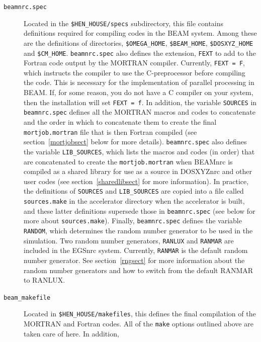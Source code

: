 \documentclass[12pt,twoside]{article}
\begin{document}
\begin{description}
\item [{\tt beamnrc.spec}] Located in the {\tt \$HEN\_HOUSE/specs}
subdirectory, this file contains definitions required for
compiling codes in the BEAM system.  Among these
are the definitions of directories, {\tt \$OMEGA\_HOME},
{\tt \$BEAM\_HOME}, {\tt \$DOSXYZ\_HOME} and {\tt \$CM\_HOME}.
{\tt beamnrc.spec} also defines the extension, {\tt FEXT} to add to the Fortran code
output by the MORTRAN compiler.  Currently, {\tt FEXT = F}, which instructs
the compiler to use the C-preprocessor before compiling the code.  This is
necessary for the implementation of parallel processing in BEAM.  If,
for some reason, you do not have a C compiler on your system, then the installation
will set {\tt FEXT = f}.  In addition, the variable {\tt SOURCES} in
{\tt beamnrc.spec} defines all the MORTRAN macros and codes
to concatenate and the order in which to concatenate them to
create the final {\tt mortjob.mortran} file that is then Fortran compiled
(see section~\ref{mortjobsect} below for more details).  {\tt beamnrc.spec}
also defines the variable {\tt LIB\_SOURCES}, which lists the macros
and codes (in order) that are concatenated to create the
{\tt mortjob.mortran} when BEAMnrc is compiled as a shared library
for use as a source in DOSXYZnrc and other user codes
(see section~\ref{sharedlibsect} for more information).  In practice, the
definitions of {\tt SOURCES} and {\tt LIB\_SOURCES} are copied into
a file called {\tt sources.make} in the accelerator directory when the
accelerator is built, and these latter definitions supersede those in
{\tt beamnrc.spec} (see below for more about {\tt sources.make}).
Finally, {\tt beamnrc.spec} defines the variable
{\tt RANDOM}, which determines the random number generator to be used
in the simulation.  Two random number generators, {\tt RANLUX} and
{\tt RANMAR} are included in the EGSnrc system.  Currently,
{\tt RANMAR} is the default random
number generator.  See section~\ref{rngsect} for more information about
the random number generators and how to switch from the default RANMAR
to RANLUX.
\item[{\tt beam\_makefile}] Located in {\tt \$HEN\_HOUSE/makefiles}, this defines
the final compilation of the MORTRAN and Fortran codes.  All of the
{\tt make} options outlined above are taken care of here.  In addition,

\end{description}
\end{document}

